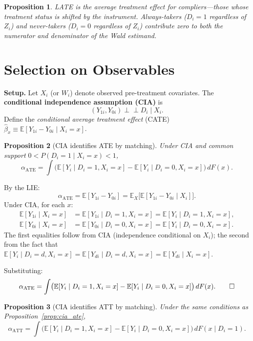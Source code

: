 \documentclass[12pt,a4paper]{article}
\theoremstyle{plain}
\newtheorem{propositio}{Proposition}[section]
\theoremstyle{definition}
\renewenvironment{proof}{\pushQED{\qed}\normalfont}{\popQED\par\nobreak}
\newcommand{\E}{\mathbb{E}}
\newcommand{\ind}{\perp\!\!\!\perp}
\newcommand{\ATT}{\alpha_{\mathrm{ATT}}}
\newcommand{\ATE}{\alpha_{\mathrm{ATE}}}
\begin{document}
\begin{propositio}
  LATE is the average treatment effect for \emph{compliers}—those whose treatment status is shifted by the instrument.  Always-takers ($D_i=1$ regardless of $Z_i$) and never-takers ($D_i=0$ regardless of $Z_i$) contribute zero to both the numerator and denominator of the Wald estimand.
\end{propositio}

\section{Selection on Observables}

\noindent\textbf{Setup.}
Let $X_i$ (or $W_i$) denote observed pre-treatment covariates. The \textbf{conditional independence assumption (CIA)} is
\[
  (Y_{1i},Y_{0i})\ind D_i \mid X_i.
\]
Define the \emph{conditional average treatment effect} (CATE) $\hat\beta_x \equiv \E[Y_{1i}-Y_{0i}\mid X_i=x]$.

\begin{propositio}[CIA identifies ATE by matching\label{prop:cia_ate}]
Under CIA and common support $0<P(D_i=1\mid X_i=x)<1$,
\[
  \ATE
  = \int \bigl(\E[Y_i\mid D_i=1,X_i=x]-\E[Y_i\mid D_i=0,X_i=x]\bigr)\,dF(x).
\]
\end{propositio}

\begin{proof}
By the LIE:
\[
  \ATE = \E[Y_{1i}-Y_{0i}] = \E_X\bigl[\E[Y_{1i}-Y_{0i}\mid X_i]\bigr].
\]
Under CIA, for each $x$:
\begin{align*}
  \E[Y_{1i}\mid X_i=x]
  &= \E[Y_{1i}\mid D_i=1,X_i=x]
   = \E[Y_i\mid D_i=1,X_i=x],\\
  \E[Y_{0i}\mid X_i=x]
  &= \E[Y_{0i}\mid D_i=0,X_i=x]
   = \E[Y_i\mid D_i=0,X_i=x].
\end{align*}
The first equalities follow from CIA (independence conditional on $X_i$); the second from the fact that $\E[Y_i\mid D_i=d,X_i=x]=\E[Y_{di}\mid D_i=d,X_i=x]=\E[Y_{di}\mid X_i=x]$.

Substituting:
\[
  \ATE = \int \bigl(\E[Y_i\mid D_i=1,X_i=x]-\E[Y_i\mid D_i=0,X_i=x]\bigr)\,dF(x). \qedhere
\]
\end{proof}

\begin{propositio}[CIA identifies ATT by matching\label{prop:cia_att}]
Under the same conditions as Proposition~\ref{prop:cia_ate},
\[
  \ATT = \int \bigl(\E[Y_i\mid D_i=1,X_i=x]-\E[Y_i\mid D_i=0,X_i=x]\bigr)\,dF(x\mid D_i=1).
\]
\end{propositio}
\end{document}
